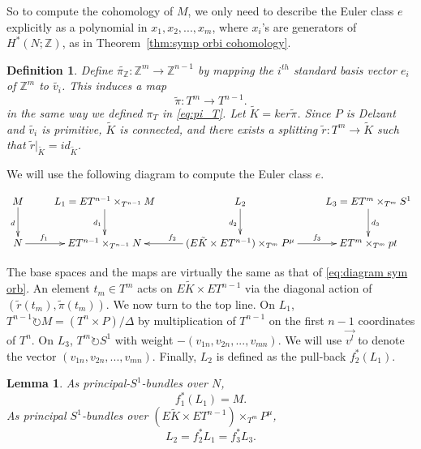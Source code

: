 \documentclass[12pt]{amsart}
\def\Z {{\mathbb{Z}}}
\newtheorem{lemma}[theorem]{Lemma}
\newtheorem{definition}[theorem]{Definition}
\theoremstyle{definition}
\numberwithin{equation}{section}
\begin{document}
So to compute the cohomology of $M$, we only need to describe the
Euler class $e$ explicitly as a polynomial in
$x_{1},x_{2},...,x_{m}$, where $x_{i}$'s are generators of
$H^{*}(N;\Z)$, as in
 Theorem~\ref{thm:symp orbi cohomology}.

\begin{definition}
Define $\tilde{\pi_{\Z}}: \Z^m\rightarrow \Z^{n-1}$ by mapping the
$i^{th}$ standard basis vector $e_{i}$ of $\Z^m$ to $\tilde{v_{i}}$.
This induces a map
\begin{equation}
\tilde{\pi}: T^m\rightarrow T^{n-1}.
\end{equation}
in the same way we defined $\pi_{T}$ in \eqref{eq:pi_T}. Let
$\tilde{K}=ker \tilde{\pi}$. Since $P$ is Delzant and
$\tilde{v_{i}}$ is primitive, $\tilde{K}$ is connected, and there
exists a splitting $\tilde{r}: T^m\rightarrow \tilde{K}$ such that
$\tilde{r}|_{\tilde{K}}=id_{\tilde{K}}$.
\end{definition}

We will use the following diagram to compute the Euler class $e$.


 {
\[\xymatrix{
  M \ar[d]_{d}  & L_{1}=ET^{n-1}\times_{T^{n-1}}M \ar[d]_{d_{1}}  &
   L_{2} \ar[d]_{d_{2}}  & L_{3}=ET^m\times_{T^m}S^1 \ar[d]^{d_{3}} \\
  N \ar[r]^(.3){f_{1}} & ET^{n-1}\times_{T^{n-1}}N &
  (E\tilde{K}\times ET^{n-1})\times_{T^m}P^{\mu} \ar[l]_{f_{2}}  \ar[r]^(0.6){f_{3}} & ET^{m}\times_{T^m}pt  }\]
}

The base spaces and the maps are virtually the same as that of
\eqref{eq:diagram sym orb}. An element $t_m\in T^m$ acts on
$E\tilde{K}\times ET^{n-1}$ via the diagonal action of
$(\tilde{r}(t_m), \tilde{\pi}(t_m))$. We now turn to the top line.
On $L_{1}$, $T^{n-1}\circlearrowright M= (T^{n}\times P)/\Delta$ by
multiplication of $T^{n-1}$ on the first $n-1$ coordinates of
$T^{n}$.
 On $L_{3}$, $T^{m}\circlearrowright S^{1}$ with weight
$-(v_{1n},v_{2n},...,v_{mn})$. We will use $\vec{v^l}$ to denote the
vector $(v_{1n},v_{2n},...,v_{mn})$. Finally,
 $L_{2}$ is defined as the pull-back $f_{2}^{*}(L_{1})$.


\begin{lemma}\label{lemma:digram Euler}
As principal-$S^{1}$-bundles over $N$,
\begin{equation}\label{eq:f_1}
f_{1}^{*}(L_{1})=M.
\end{equation}
As principal $S^{1}$-bundles over $(E\tilde{K}\times
ET^{n-1})\times_{T^m}P^{\mu}$,
\begin{equation}\label{eq:L_2}
L_{2}=f_{2}^{*}L_{1}= f_{3}^{*}L_{3}.
\end{equation}
\end{lemma}
\end{document}
